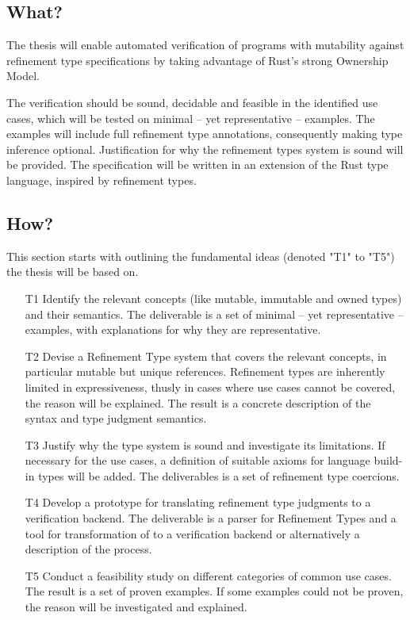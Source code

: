 \documentclass[11pt]{article}
\begin{document}
\subsection{What?}

The thesis will enable automated verification of programs with mutability against refinement type specifications by taking advantage of Rust's strong Ownership Model.

The verification should be sound, decidable and feasible in the identified use cases, which will be tested on minimal -- yet representative -- examples. The examples will include full refinement type annotations, consequently making type inference optional.
Justification for why the refinement types system is sound will be provided.
The specification will be written in an extension of the Rust type language, inspired by refinement types.

\subsection{How?} \label{ssec:How}

This section starts with outlining the fundamental ideas (denoted "T1" to "T5") the thesis will be based on.

\begin{itemize}
	\item[T1] Identify the relevant concepts (like mutable, immutable and owned types) and their semantics. The deliverable is a set of minimal -- yet representative -- examples, with explanations for why they are representative.
	\item[T2] Devise a Refinement Type system that covers the relevant concepts, in particular mutable but unique references. Refinement types are inherently limited in expressiveness, thusly in cases where use cases cannot be covered, the reason will be explained. The result is a concrete description of the syntax and type judgment semantics.
	\item[T3] Justify why the type system is sound and investigate its limitations. If necessary for the use cases, a definition of suitable axioms for language build-in types will be added. The deliverables is a set of refinement type coercions.
	\item[T4] Develop a prototype for translating refinement type judgments to a verification backend. The deliverable is a parser for Refinement Types and a tool for transformation of to a verification backend or alternatively a description of the process.
	\item[T5] Conduct a feasibility study on different categories of common use cases. The result is a set of proven examples. If some examples could not be proven, the reason will be investigated and explained.
\end{itemize}
\end{document}
